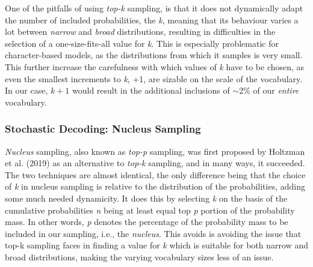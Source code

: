 One of the pitfalls of using \textit{top-k} sampling, is that it does not dynamically adapt the number of included probabilities, the \textit{k}, meaning that its behaviour varies a lot between \textit{narrow} and \textit{broad} distributions, resulting in difficulties in the selection of a one-size-fits-all value for \textit{k}. This is especially problematic for character-based models, as the distributions from which it samples is very small. This further increase the carefulness with which values of \textit{k} have to be chosen, as even the smallest increments to \textit{k}, +1, are sizable on the scale of the vocabulary. In our case, $k + 1$ would result in the additional inclusions of $\sim$2\% of our \textit{entire} vocabulary.

\subsubsection{Stochastic Decoding: Nucleus Sampling}
\label{sec:sto-top-p}

\textit{Nucleus} sampling, also known as \textit{top-p} sampling, was first proposed by Holtzman et al. (2019) \cite{HoltzmanAri2019TCCo} as an alternative to \textit{top-k} sampling, and in many ways, it succeeded. The two techniques are almost identical, the only difference being that the choice of \textit{k} in nucleus sampling is relative to the distribution of the probabilities, adding some much needed dynamicity. It does this by selecting \textit{k} on the basis of the cumulative probabilities \textit{n} being at least equal top \textit{p} portion of the probability mass. In other words, \textit{p} denotes the percentage of the probability mass to be included in our sampling, i.e., the \textit{nucleus}. This avoids is avoiding the issue that top-k sampling faces in finding a value for \textit{k} which is suitable for both narrow and broad distributions, making the varying vocabulary sizes less of an issue.
